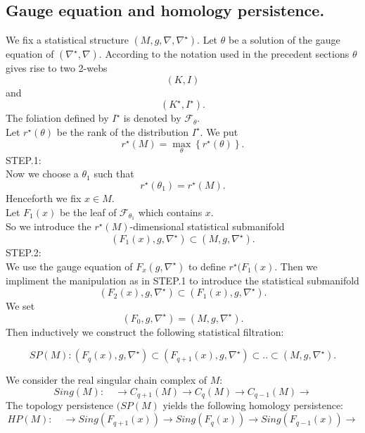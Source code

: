 \subsection{Gauge equation and homology persistence.}
We fix a statistical structure $(M,g,\nabla,\nabla^\star).$ Let $\theta$ be a solution of the gauge equation of $(\nabla^\star,\nabla)$. According to the notation used in the precedent sections $\theta$ gives rise to two 2-webs
$$(K,I)$$ and $$(K^\star,I^\star).$$
The foliation defined by $I^\star$ is denoted by $\mathcal{F}_\theta$.\\
Let $r^\star(\theta)$ be the rank of the distribution $I^\star$. We put
$$r^\star(M) = \max_\theta\left\{r^\star(\theta)\right\}.$$
STEP.1:\\
Now we choose a $\theta_1$ such that
$$r^\star(\theta_1) = r^\star(M).$$
Henceforth we fix $x \in M$.\\
Let $F_1(x)$ be the leaf of $\mathcal{F}_{\theta_1}$ which contains $x$.\\
So we introduce the $r^\star(M)$-dimensional statistical submanifold $$(F_1(x),g,\nabla^\star) \subset (M,g,\nabla^\star).$$ 
STEP.2:\\
We use the gauge equation of $F_x(g,\nabla^\star)$ to define $r^\star(F_1(x)$. Then we impliment the manipulation as in STEP.1 to introduce the statistical submanifold
$$ (F_2(x),g,\nabla^\star) \subset (F_1(x),g,\nabla^\star).$$
We set 
$$(F_0,g,\nabla^\star) = (M,g,\nabla^\star).$$
Then inductively we construct the following statistical filtration:

\begin{equation} SP(M):(F_q(x),g,\nabla^\star)\subset (F_{q+1}(x),g,\nabla^\star)\subset .. \subset (M,g,\nabla^\star).
\end{equation}


We consider the real singular chain complex of $M$:
\begin{equation}
   Sing(M): \quad \rightarrow C_{q+1}(M)\rightarrow C_q(M)\rightarrow C_{q-1}(M) \rightarrow 
\end{equation}
The topology persistence $(SP(M)$ yields the following homology persistence:
\begin{equation}
  HP(M):\quad \rightarrow Sing(F_{q+1}(x))\rightarrow Sing(F_q(x))\rightarrow Sing(F_{q-1}(x))\rightarrow  
\end{equation}
